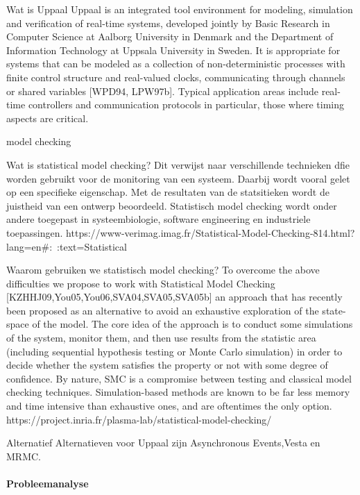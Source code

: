 Wat is Uppaal
Uppaal is an integrated tool environment for modeling, simulation and verification of real-time systems, developed jointly by Basic Research in Computer Science at Aalborg University in Denmark and the Department of Information Technology at Uppsala University in Sweden. It is appropriate for systems that can be modeled as a collection of non-deterministic processes with finite control structure and real-valued clocks, communicating through channels or shared variables [WPD94, LPW97b]. Typical application areas include real-time controllers and communication protocols in particular, those where timing aspects are critical.


model checking

Wat is statistical model checking?
Dit verwijst naar verschillende technieken dfie worden gebruikt voor de monitoring van een systeem. Daarbij wordt vooral gelet op een specifieke eigenschap. Met de resultaten van de statsitieken wordt de juistheid van een ontwerp beoordeeld. Statistisch model checking wordt onder andere toegepast in systeembiologie, software engineering en industriele toepassingen.
https://www-verimag.imag.fr/Statistical-Model-Checking-814.html?lang=en#:~:text=Statistical%


\cite{inriaStatsMoodCheck}
\cite{ buddeModelChecker}
\cite{AGHASuervey }


Waarom gebruiken we statistisch model checking?
To overcome the above difficulties we propose to work with Statistical Model Checking [KZHHJ09,You05,You06,SVA04,SVA05,SVA05b] an approach that has recently been proposed as an alternative to avoid an exhaustive exploration of the state-space of the model. The core idea of the approach is to conduct some simulations of the system, monitor them, and then use results from the statistic area (including sequential hypothesis testing or Monte Carlo simulation) in order to decide whether the system satisfies the property or not with some degree of confidence. By nature, SMC is a compromise between testing and classical model checking techniques. Simulation-based methods are known to be far less memory and time intensive than exhaustive ones, and are oftentimes the only option. 
https://project.inria.fr/plasma-lab/statistical-model-checking/

Alternatief
Alternatieven voor Uppaal zijn Asynchronous Events,Vesta en MRMC.

\paragraph{Probleemanalyse}

